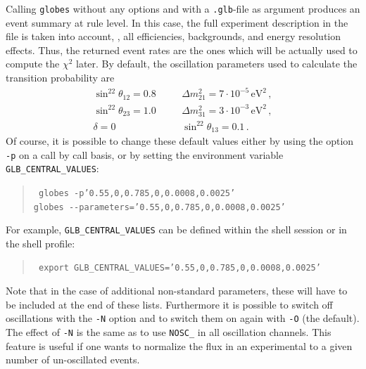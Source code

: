 Calling {\tt globes} without any options and with a {\tt .glb}-file as argument produces an event summary at rule level. In this case,  
the full experiment description in the file is taken into account, \ie, all efficiencies, backgrounds, and energy resolution effects. 
Thus, the returned event rates are the ones which will be actually 
used to compute the $\chi^2$ later. By default, the oscillation parameters used to calculate the transition probability are
\begin{eqnarray}
\label{eq:globes_params}
\sin^22\theta_{12}=0.8&\quad&\Delta m^2_{21}=7\cdot10^{-5}
\,\mathrm{eV}^2\,,\nonumber\\
\sin^22\theta_{23}=1.0&\quad&\Delta m^2_{31}=3\cdot10^{-3}
\,\mathrm{eV}^2\,,\nonumber\\
\delta=0&\quad&\sin^22\theta_{13}=0.1\,.\
\end{eqnarray}
Of course, it is possible to change these default values either by using the
option {\tt -p} on a call by call basis, or by setting the environment variable
{\tt GLB\_CENTRAL\_VALUES}:
%
%
\begin{quote}
{\tt
globes -p'0.55,0,0.785,0,0.0008,0.0025'\\
globes \verb+--+parameters='0.55,0,0.785,0,0.0008,0.0025'
}
\end{quote}
For example, {\tt GLB\_CENTRAL\_VALUES} can be defined
within the shell session or in the shell profile:
\begin{quote}
{\tt
export GLB\_CENTRAL\_VALUES='0.55,0,0.785,0,0.0008,0.0025'
}
\end{quote}
Note that in the case of additional non-standard parameters, these will have to 
be included at the end of these lists.
Furthermore it is possible to switch off oscillations with the {\tt -N} option and to switch them on again with {\tt -O} (the default). The effect of {\tt -N} is the same as to use {\tt NOSC\_} in all oscillation channels.
This feature is useful if one wants to normalize the flux in an experimental to
a given number of un-oscillated events.

